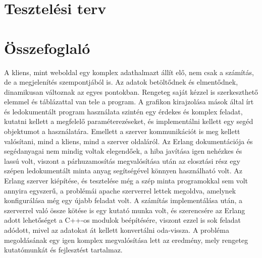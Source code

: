 \section{Tesztelési terv}


\newpage
\section{Összefoglaló}
	A kliens, mint weboldal egy komplex adathalmazt állít elő, nem csak a számítás, de a megjelenítés szempontjából is. Az adatok betöltődnek és elmentődnek, dinamikusan változnak az egyes pontokban. Rengeteg saját kézzel is szerkeszthető elemmel és táblázattal van tele a program. A grafikon kirajzolása mások által írt és ledokumentált program használata szintén egy érdekes és komplex feladat, kutatni kellett a megfelelő paraméterezéseket, és implementálni kellett egy segéd objektumot a használatára.\newline
	Emellett a szerver kommunikációt is meg kellett valósítani, mind a kliens, mind a szerver oldaláról. \newline
	Az Erlang dokumentációja és segédanyagai nem mindig voltak elegendőek, a hiba javítása igen nehézkes és lassú volt, viszont a párhuzamosítás megvalósítása után az elosztási rész egy szépen ledokumentált minta anyag segítségével könnyen használható volt. \newline  
	Az Erlang szerver kiépítése, és tesztelése még a szép minta programokkal sem volt annyira egyszerű, a problémái apache szerverrel lettek megoldva, amelynek konfigurálása még egy újabb feladat volt. \newline
	A számítás implementálása után, a szerverrel való össze kötése is egy kutató munka volt, és szerencsére az Erlang adott lehetőséget a C++-os modulok beépítésére, viszont ezzel is sok feladat adódott, mivel az adatokat át kellett konvertálni oda-vissza.
	\newline
	A probléma megoldásának egy igen komplex megvalósítása lett az eredmény, mely rengeteg kutatómunkát és fejlesztést tartalmaz.